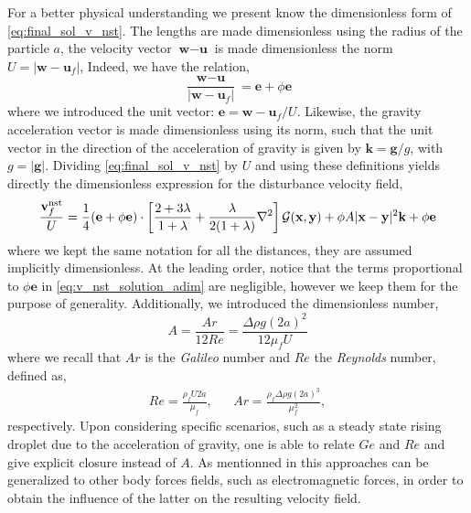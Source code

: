 For a better physical understanding we present know the dimensionless form of \ref{eq:final_sol_v_nst}. 
The lengths are made dimensionless using the radius of the particle $a$, the velocity vector $\textbf{w} - \textbf{u}$ is made dimensionless the norm $U = |\textbf{w} - \textbf{u}_f|$, 
Indeed, we have the relation, 
\begin{equation*}
    \frac{\textbf{w} - \textbf{u}}{|\textbf{w} - \textbf{u}_f|}
    = \textbf{e} + \phi \textbf{e}
\end{equation*}
where we introduced the unit vector: $\textbf{e} = \textbf{w} - \textbf{u}_f/U$. 
Likewise, the gravity acceleration vector is made dimensionless using its norm, such that the unit vector in the direction of the acceleration of gravity is given by $\textbf{k} = \textbf{g} / g$, with $g = |\textbf{g}|$. 
Dividing \ref{eq:final_sol_v_nst} by $U$ and using these definitions yields directly the dimensionless expression for the disturbance velocity field, 
\begin{equation}
    \frac{\textbf{v}^\text{nst}_f}{U}
    =
    \frac{1}{4}(\textbf{e}+ \phi \textbf{e})\cdot\left[
        \frac{2+3\lambda}{1+\lambda}
        +
        \frac{\lambda}{2(1+\lambda)}\grad^2 
    \right]\mathcal{G}(\textbf{x},\textbf{y})
    + \phi A |\textbf{x}-\textbf{y}|^2 \textbf{k}
    +\phi \textbf{e}
    \label{eq:v_nst_solution_adim}
\end{equation}
where we kept the same notation for all the distances, they are assumed implicitly dimensionless. 
At the leading order, notice that the terms proportional to $\phi \textbf{e}$ in \ref{eq:v_nst_solution_adim} are negligible, however we keep them for the purpose of generality. 
Additionally, we introduced the dimensionless number, 
\begin{equation}
    A = \frac{Ar}{12 Re}=\frac{\Delta \rho g (2a)^2}{12 \mu_f U}
    \label{eq:A_general}
\end{equation}
where we recall that $Ar$ is the \textit{Galileo} number and $Re$ the \textit{Reynolds} number, defined as,  
\begin{align*}
    Re= \frac{\rho_f U 2a}{\mu_f},
    &&
    Ar = \frac{\rho_f \Delta\rho g (2a)^3}{\mu_f^2},
\end{align*}
respectively. 
Upon considering specific scenarios, such as a steady state rising droplet due to the acceleration of gravity, one is able to relate $Ge$ and $Re$ and give explicit closure instead of $A$. 
As mentionned in \citet{zhang2021ensemble} this approaches can be generalized to other body forces fields, such as electromagnetic forces, in order to obtain the influence of the latter on the resulting velocity field.

